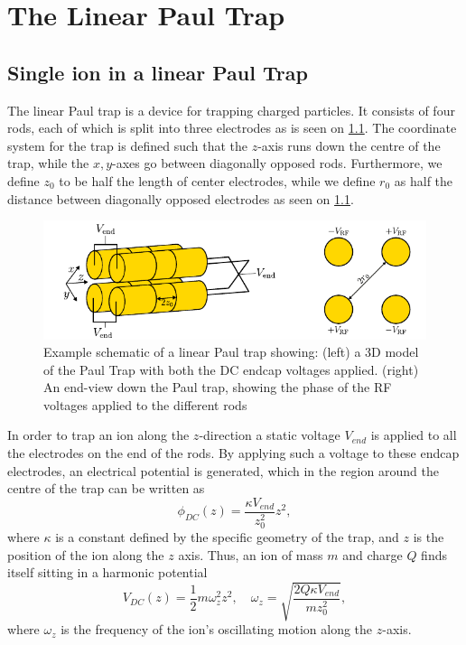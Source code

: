 \chapter{The Linear Paul Trap}
\label{chap:LinTrap}

\section{Single ion in a linear Paul Trap}
\label{sec:1Ion}
The linear Paul trap is a device for trapping charged particles. It consists of four rods, each of which is split into three electrodes as is seen on \cref{fig:PaulTrap}. The coordinate system for the trap is defined such that the $z$-axis runs down the centre of the trap,
while the $x,y$-axes go between diagonally opposed rods. Furthermore, we define $z_0$ to be half the length of center electrodes, while we define $r_0$ as half the distance between diagonally opposed electrodes as seen on \cref{fig:PaulTrap}.
\begin{figure}
    \centering
    \includegraphics{main/Paul_Trap.pdf}
    \caption{Example schematic of a linear Paul trap showing: (left) a 3D model of the Paul Trap with both the DC endcap voltages applied.
    (right) An end-view down the Paul trap, showing the phase of the RF voltages applied to the different rods}
    \label{fig:PaulTrap}
\end{figure}


In order to trap an ion along the $z$-direction a static voltage $V_{end}$ is applied to all the electrodes on the end of the rods. By applying such a voltage to these endcap electrodes, an electrical potential is generated, which in the region around the centre of the trap can be written as
\begin{equation}
    \phi_{DC}(z) = \frac{\kappa V_{end}}{z_0^2}z^2,
    \label{eq:phi_DC_z} 
\end{equation}
where $\kappa$ is a constant defined by the specific geometry of the trap, and $z$ is the position of the ion along the $z$ axis.
Thus, an ion of mass $m$ and charge $Q$ finds itself sitting in a harmonic potential
\begin{equation}
    \label{eq:omega_z}
    V_{DC}(z) = \frac{1}{2}m\omega_z^2 z^2, \quad\omega_z = \sqrt{\frac{2Q\kappa V_{end}}{mz_0^2}},
\end{equation}
where $\omega_z$ is the frequency of the ion's oscillating motion along the $z$-axis.

